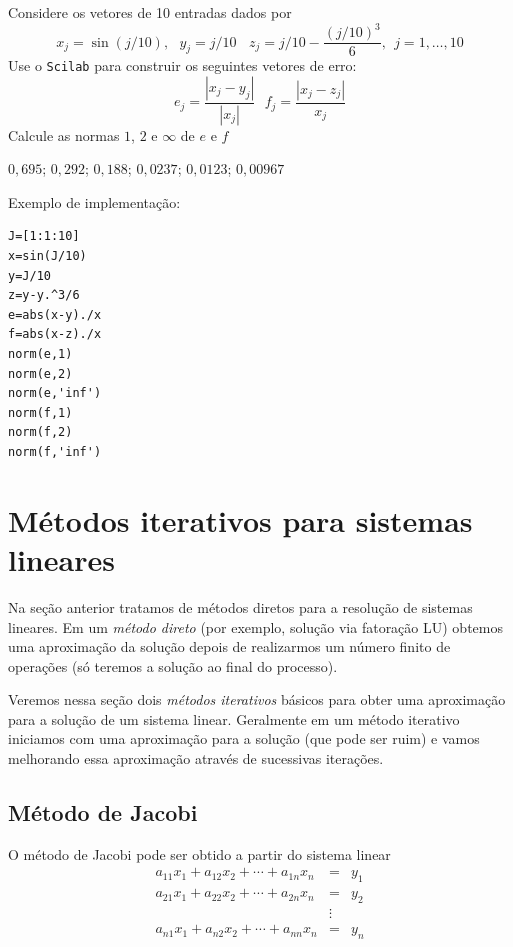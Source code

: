 \begin{exer} Considere os vetores de 10 entradas dados por $$x_j=\sin(j/10),~~~y_j=j/10~~~~z_j=j/10-\frac{\left(j/10\right)^3}{6},~~ j=1,\ldots,10$$
Use o \verb+Scilab+ para construir os seguintes vetores de erro:
$$e_{j}=\frac{|x_j-y_j|}{|x_j|}~~~ f_j=\frac{|x_j-z_j|}{x_j}$$
Calcule as normas $1$, $2$ e $\infty$ de $e$ e $f$
\end{exer}
\begin{resp}
$0,695$; $0,292$; $0,188$;  $0,0237$; $0,0123$; $0,00967$

\ifisscilab
Exemplo de implementação:
\begin{verbatim}
J=[1:1:10]
x=sin(J/10)
y=J/10
z=y-y.^3/6
e=abs(x-y)./x
f=abs(x-z)./x
norm(e,1)
norm(e,2)
norm(e,'inf')
norm(f,1)
norm(f,2)
norm(f,'inf')
\end{verbatim}
\fi    
\end{resp}



\section{Métodos iterativos para sistemas lineares}
Na seção anterior tratamos de métodos diretos para a resolução de sistemas lineares. Em um \emph{método direto} (por exemplo, solução via fatoração LU) obtemos uma aproximação da solução depois de realizarmos um número finito de operações (só teremos a solução ao final do processo).

Veremos nessa seção dois \emph{métodos iterativos} básicos para obter uma aproximação para a solução de um sistema linear. Geralmente em um método iterativo iniciamos com uma aproximação para a solução (que pode ser ruim) e vamos melhorando essa aproximação através de sucessivas iterações.

\subsection{Método de Jacobi}
O método de Jacobi pode ser obtido a partir do sistema linear
\begin{eqnarray*}
a_{11}x_1+a_{12}x_2+\cdots+a_{1n}x_n&=&y_1\\
a_{21}x_1+a_{22}x_2+\cdots+a_{2n}x_n&=&y_2\\
&\vdots&     \\
a_{n1}x_1+a_{n2}x_2+\cdots+a_{nn}x_n&=& y_n
\end{eqnarray*}

